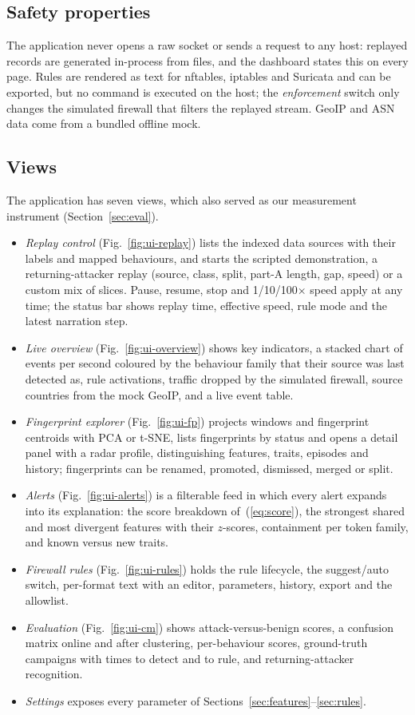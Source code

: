 \documentclass[conference]{IEEEtran}
\begin{document}
\subsection{Safety properties}
The application never opens a raw socket or sends a request to any host: replayed records are generated in-process from files, and the dashboard states this on every page. Rules are rendered as text for nftables, iptables and Suricata and can be exported, but no command is executed on the host; the \emph{enforcement} switch only changes the simulated firewall that filters the replayed stream. GeoIP and ASN data come from a bundled offline mock.

\subsection{Views}
The application has seven views, which also served as our measurement instrument (Section~\ref{sec:eval}).
\begin{itemize}
\item \emph{Replay control} (Fig.~\ref{fig:ui-replay}) lists the indexed data sources with their labels and mapped behaviours, and starts the scripted demonstration, a returning-attacker replay (source, class, split, part-A length, gap, speed) or a custom mix of slices. Pause, resume, stop and 1/10/100$\times$ speed apply at any time; the status bar shows replay time, effective speed, rule mode and the latest narration step.
\item \emph{Live overview} (Fig.~\ref{fig:ui-overview}) shows key indicators, a stacked chart of events per second coloured by the behaviour family that their source was last detected as, rule activations, traffic dropped by the simulated firewall, source countries from the mock GeoIP, and a live event table.
\item \emph{Fingerprint explorer} (Fig.~\ref{fig:ui-fp}) projects windows and fingerprint centroids with PCA or t-SNE, lists fingerprints by status and opens a detail panel with a radar profile, distinguishing features, traits, episodes and history; fingerprints can be renamed, promoted, dismissed, merged or split.
\item \emph{Alerts} (Fig.~\ref{fig:ui-alerts}) is a filterable feed in which every alert expands into its explanation: the score breakdown of~(\ref{eq:score}), the strongest shared and most divergent features with their $z$-scores, containment per token family, and known versus new traits.
\item \emph{Firewall rules} (Fig.~\ref{fig:ui-rules}) holds the rule lifecycle, the suggest/auto switch, per-format text with an editor, parameters, history, export and the allowlist.
\item \emph{Evaluation} (Fig.~\ref{fig:ui-cm}) shows attack-versus-benign scores, a confusion matrix online and after clustering, per-behaviour scores, ground-truth campaigns with times to detect and to rule, and returning-attacker recognition.
\item \emph{Settings} exposes every parameter of Sections~\ref{sec:features}--\ref{sec:rules}.
\end{itemize}
\end{document}
